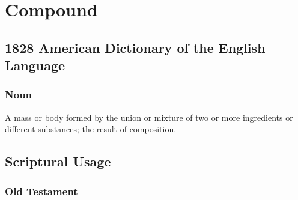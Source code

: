 \section{Compound}
	\label{COMPOUND}
	

\subsection{1828 American Dictionary of the English Language} %
	\label{COMPOUND-1828}
	
	\subsubsection{Noun}

		\begin{compactitem}
			\item A mass or body formed by the union or mixture of two or more ingredients or different substances; the result of composition.
		\end{compactitem}



\subsection{Scriptural Usage} %
	\label{COMPOUND-SCRIPTURES}

	\subsubsection{Old Testament} %
		\label{COMPOUND-OT}
	

